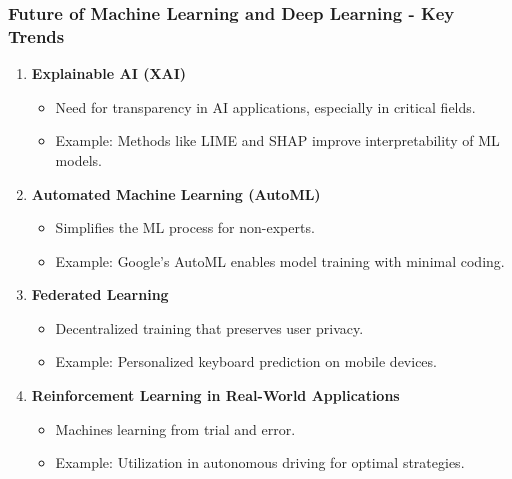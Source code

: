 \documentclass[aspectratio=169]{beamer}
\begin{document}
\begin{frame}[fragile]
    \frametitle{Future of Machine Learning and Deep Learning - Key Trends}
    \begin{enumerate}
        \item \textbf{Explainable AI (XAI)}
            \begin{itemize}
                \item Need for transparency in AI applications, especially in critical fields.
                \item Example: Methods like LIME and SHAP improve interpretability of ML models.
            \end{itemize}
        
        \item \textbf{Automated Machine Learning (AutoML)}
            \begin{itemize}
                \item Simplifies the ML process for non-experts.
                \item Example: Google’s AutoML enables model training with minimal coding.
            \end{itemize}
        
        \item \textbf{Federated Learning}
            \begin{itemize}
                \item Decentralized training that preserves user privacy.
                \item Example: Personalized keyboard prediction on mobile devices.
            \end{itemize}

        \item \textbf{Reinforcement Learning in Real-World Applications}
            \begin{itemize}
                \item Machines learning from trial and error.
                \item Example: Utilization in autonomous driving for optimal strategies.
            \end{itemize}
    \end{enumerate}
\end{frame}
\end{document}
